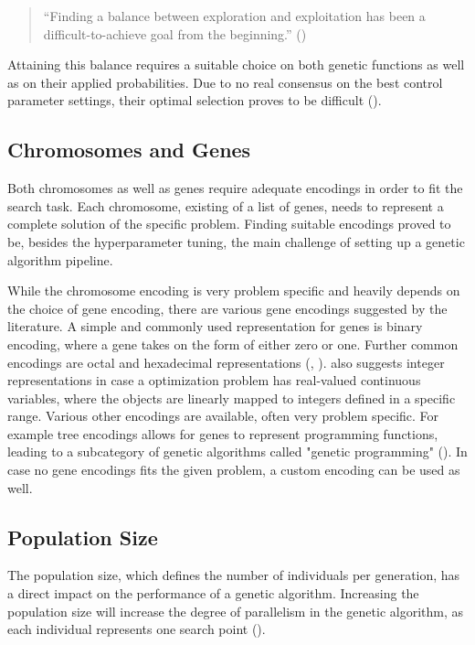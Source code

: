 \begin{quote}
	\begin{em}
		\enquote{Finding a balance between exploration and exploitation has been a difficult-to-achieve goal from the beginning.} (\cite{kacprzyk_parameter_2007})
	\end{em}
\end{quote}

Attaining this balance requires a suitable choice on both genetic functions as well as on their applied probabilities. Due to no real consensus on the best control parameter settings, their optimal selection proves to be difficult (\cite{kacprzyk_parameter_2007}).

\subsection{Chromosomes and Genes}
\label{sect:foundations:chromosomes_and_genes}
Both chromosomes as well as genes require adequate encodings in order to fit the search task. Each chromosome, existing of a list of genes, needs to represent a complete solution of the specific problem. Finding suitable encodings proved to be, besides the hyperparameter tuning, the main challenge of setting up a genetic algorithm pipeline.

While the chromosome encoding is very problem specific and heavily depends on the choice of gene encoding, there are various gene encodings suggested by the literature. A simple and commonly used representation for genes is binary encoding, where a gene takes on the form of either zero or one. Further common encodings are octal and hexadecimal representations (\cite{srinivas_genetic_1994}, \cite{katoch_review_2021}). \cite{srinivas_genetic_1994} also suggests integer representations in case a optimization problem has real-valued continuous variables, where the objects are linearly mapped to integers defined in a specific range. Various other encodings are available, often very problem specific. For example tree encodings allows for genes to represent programming functions, leading to a subcategory of genetic algorithms called "genetic programming" (\cite{katoch_review_2021}). In case no gene encodings fits the given problem, a custom encoding can be used as well.

\subsection{Population Size}
The population size, which defines the number of individuals per generation, has a direct impact on the performance of a genetic algorithm. Increasing the population size will increase the degree of parallelism in the genetic algorithm, as each individual represents one search point (\cite{mills_determining_2015}).

